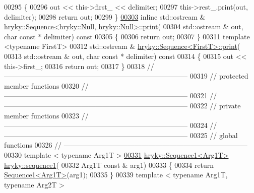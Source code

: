\begin{DoxyCode}
00295 \textcolor{keyword}{}\{
00296     out << this->first\_ << delimiter;
00297     this->rest\_.print(out, delimiter);
00298     \textcolor{keywordflow}{return} out;
00299 \}
\hypertarget{sequence_8h_source_l00303}{}\hyperlink{classhryky_1_1_sequence_3_01hryky_1_1_null_00_01hryky_1_1_null_01_4_a418fe8226cd08488f37dfd780d99a069}{00303} \textcolor{keyword}{inline} std::ostream & \hyperlink{classhryky_1_1_sequence_a8443de2eb918764c345a86b40dd888db}{hryky::Sequence<hryky::Null, hryky::Null>::print}(
00304     std::ostream & out, \textcolor{keywordtype}{char} \textcolor{keyword}{const} * delimiter)\textcolor{keyword}{ const}
00305 \textcolor{keyword}{}\{
00306     \textcolor{keywordflow}{return} out;
00307 \}
00311 \textcolor{keyword}{template} <\textcolor{keyword}{typename} FirstT>
00312 std::ostream & \hyperlink{classhryky_1_1_sequence}{hryky::Sequence<FirstT>::print}(
00313     std::ostream & out, \textcolor{keywordtype}{char} \textcolor{keyword}{const} * delimiter)\textcolor{keyword}{ const}
00314 \textcolor{keyword}{}\{
00315     out << this->first\_;
00316     \textcolor{keywordflow}{return} out;
00317 \}
00318 \textcolor{comment}{//
      ------------------------------------------------------------------------------}
00319 \textcolor{comment}{// protected member functions}
00320 \textcolor{comment}{//
      ------------------------------------------------------------------------------}
00321 \textcolor{comment}{//
      ------------------------------------------------------------------------------}
00322 \textcolor{comment}{// private member functions}
00323 \textcolor{comment}{//
      ------------------------------------------------------------------------------}
00324 \textcolor{comment}{//
      ------------------------------------------------------------------------------}
00325 \textcolor{comment}{// global functions}
00326 \textcolor{comment}{//
      ------------------------------------------------------------------------------}
00330 \textcolor{comment}{}\textcolor{keyword}{template} < \textcolor{keyword}{typename} Arg1T >
\hypertarget{sequence_8h_source_l00331}{}\hyperlink{namespacehryky_a7f53e66b99b4eadc301227b9330ff1af}{00331} \hyperlink{classhryky_1_1_sequence1}{hryky::Sequence1<Arg1T>} \hyperlink{namespacehryky_a7f53e66b99b4eadc301227b9330ff1af}{hryky::sequence1}(
00332     Arg1T \textcolor{keyword}{const} & arg1)
00333 \{
00334     \textcolor{keywordflow}{return} \hyperlink{classhryky_1_1_sequence1}{Sequence1<Arg1T>}(arg1);
00335 \}
00339 \textcolor{keyword}{template} < \textcolor{keyword}{typename} Arg1T, \textcolor{keyword}{typename} Arg2T >

\end{DoxyCode}
